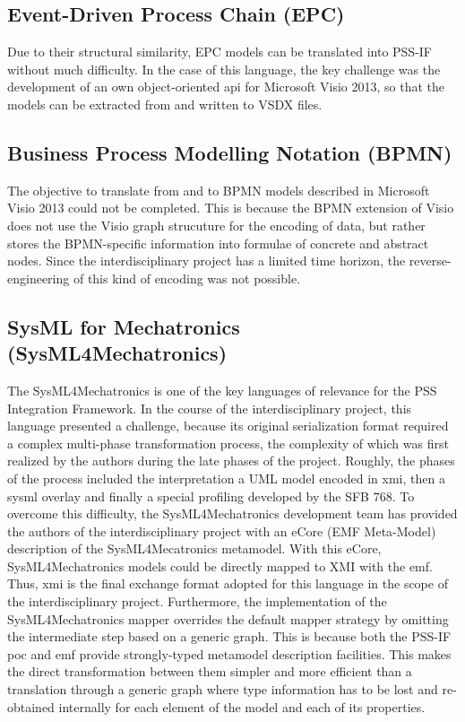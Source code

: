 \subsection{Event-Driven Process Chain (EPC)}

Due to their structural similarity, EPC models can be translated into PSS-IF without much difficulty. In the case of this language, the key challenge was the development of an own object-oriented \gls{api} for Microsoft Visio 2013, so that the models can be extracted from and written to VSDX files.

\subsection{Business Process Modelling Notation (BPMN)}

The objective to translate from and to BPMN models described in Microsoft Visio 2013 could not be completed. This is because the BPMN extension of Visio does not use the Visio graph strucuture for the encoding of data, but rather stores the BPMN-specific information into formulae of concrete and abstract nodes. Since the interdisciplinary project has a limited time horizon, the reverse-engineering of this kind of encoding was not possible. 

\subsection{SysML for Mechatronics (SysML4Mechatronics)}

The SysML4Mechatronics is one of the key languages of relevance for the PSS Integration Framework. In the course of the interdisciplinary project, this language presented a challenge, because its original serialization format required a complex multi-phase transformation process, the complexity of which was first realized by the authors during the late phases of the project. Roughly, the phases of the process included the interpretation a UML model encoded in \gls{xmi}, then a \gls{sysml} overlay and finally a special profiling developed by the SFB 768. To overcome this difficulty, the SysML4Mechatronics development team has provided the authors of the interdisciplinary project with an eCore (EMF Meta-Model) description of the SysML4Mecatronics metamodel. With this eCore, SysML4Mechatronics models could be directly mapped to XMI with the \gls{emf}. Thus, \gls{xmi} is the final exchange format adopted for this language in the scope of the interdisciplinary project. Furthermore, the implementation of the SysML4Mechatronics mapper overrides the default mapper strategy by omitting the intermediate step based on a generic graph. This is because both the PSS-IF \gls{poc} and \gls{emf} provide strongly-typed metamodel description facilities. This makes the direct transformation between them simpler and more efficient than a translation through a generic graph where type information has to be lost and re-obtained internally for each element of the model and each of its properties.

